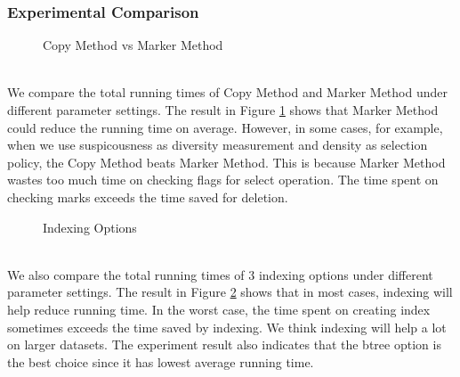 \subsubsection{Experimental Comparison}
\begin{figure}[h]
    \begin{center}
    \end{center}
    \caption{Copy Method vs Marker Method}
    \label{fig:CopyMarker}
\end{figure}\\
We compare the total running times of Copy Method and Marker Method under different parameter settings. The result in Figure \ref{fig:CopyMarker} shows that Marker Method could reduce the running time on average. However, in some cases, for example, when we use suspicousness as diversity measurement and density as selection policy, the Copy Method beats Marker Method. This is because Marker Method wastes too much time on checking flags for select operation. The time spent on checking marks exceeds the time saved for deletion.\\
\begin{figure}[h]
    \begin{center}
    \end{center}
    \caption{Indexing Options}
    \label{fig:Indexing}
\end{figure}\\
We also compare the total running times of 3 indexing options under different parameter settings. The result in Figure \ref{fig:Indexing} shows that in most cases, indexing will help reduce running time. In the worst case, the time spent on creating index sometimes exceeds the time saved by indexing. We think indexing will help a lot on larger datasets. The experiment result also indicates that the btree option is the best choice since it has lowest average running time.\\